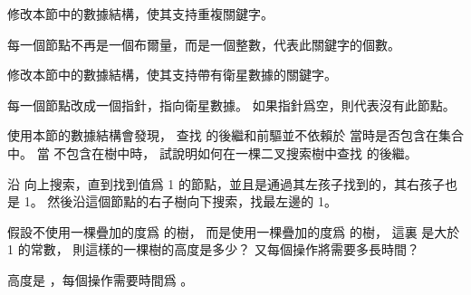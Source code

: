 \startsection[
  title={Preliminary approaches},
]

\startEXERCISE
修改本節中的數據結構，使其支持重複關鍵字。
\stopEXERCISE

\startANSWER
每一個節點不再是一個布爾量，而是一個整數，代表此關鍵字的個數。
\stopANSWER

\startEXERCISE
修改本節中的數據結構，使其支持帶有衛星數據的關鍵字。
\stopEXERCISE

\startANSWER
每一個節點改成一個指針，指向衛星數據。
如果指針爲空，則代表沒有此節點。
\stopANSWER

\startEXERCISE
使用本節的數據結構會發現，
查找  的後繼和前驅並不依賴於  當時是否包含在集合中。
當  不包含在樹中時，
試說明如何在一棵二叉搜索樹中查找  的後繼。
\stopEXERCISE

\startANSWER
沿  向上搜索，直到找到值爲 1 的節點，並且是通過其左孩子找到的，其右孩子也是 1。
然後沿這個節點的右子樹向下搜索，找最左邊的 1。
\stopANSWER

\startEXERCISE
假設不使用一棵疊加的度爲  的樹，
而是使用一棵疊加的度爲  的樹，
這裏  是大於 1 的常數，
則這樣的一棵樹的高度是多少？
又每個操作將需要多長時間？
\stopEXERCISE

\startANSWER
高度是 ，每個操作需要時間爲 。
\stopANSWER

\stopsection
